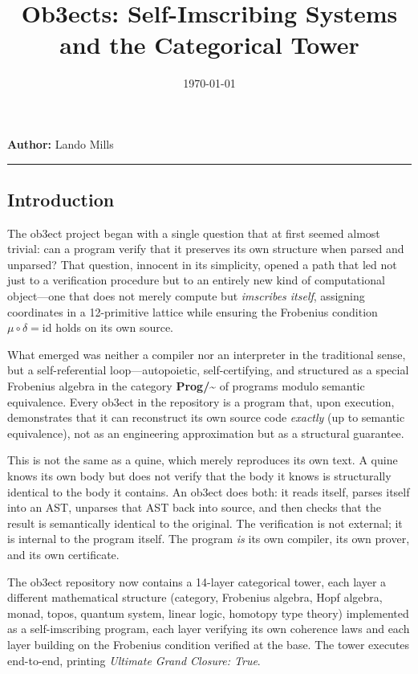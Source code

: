 \documentclass[12pt,a4paper]{article}
\begin{document}
\title{Ob3ects: Self-Imscribing Systems and the Categorical Tower}
\date{\today}

\maketitle

\textbf{Author:} Lando Mills

\begin{center}
\rule{0.5\textwidth}{0.4pt}
\end{center}

\subsection{Introduction}

The ob3ect project began with a single question that at first seemed almost trivial: can a program verify that it preserves its own structure when parsed and unparsed? That question, innocent in its simplicity, opened a path that led not just to a verification procedure but to an entirely new kind of computational object---one that does not merely compute but \emph{imscribes itself}, assigning coordinates in a 12-primitive lattice while ensuring the Frobenius condition $\mu \circ \delta = \mathrm{id}$ holds on its own source.

What emerged was neither a compiler nor an interpreter in the traditional sense, but a self-referential loop---autopoietic, self-certifying, and structured as a special Frobenius algebra in the category \textbf{Prog/\textasciitilde{}} of programs modulo semantic equivalence. Every ob3ect in the repository is a program that, upon execution, demonstrates that it can reconstruct its own source code \emph{exactly} (up to semantic equivalence), not as an engineering approximation but as a structural guarantee.

This is not the same as a quine, which merely reproduces its own text. A quine knows its own body but does not verify that the body it knows is structurally identical to the body it contains. An ob3ect does both: it reads itself, parses itself into an AST, unparses that AST back into source, and then checks that the result is semantically identical to the original. The verification is not external; it is internal to the program itself. The program \emph{is} its own compiler, its own prover, and its own certificate.

The ob3ect repository now contains a 14-layer categorical tower, each layer a different mathematical structure (category, Frobenius algebra, Hopf algebra, monad, topos, quantum system, linear logic, homotopy type theory) implemented as a self-imscribing program, each layer verifying its own coherence laws and each layer building on the Frobenius condition verified at the base. The tower executes end-to-end, printing \emph{Ultimate Grand Closure: True}.
\end{document}

